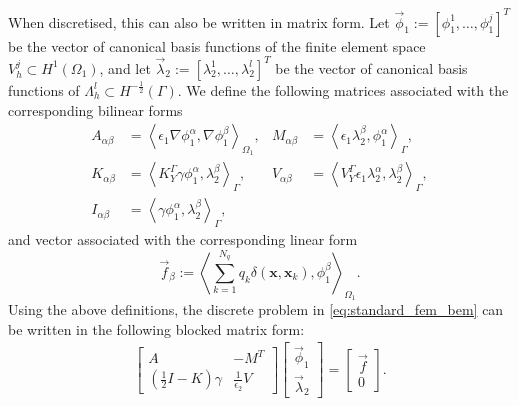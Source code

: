 When discretised, this can also be written in matrix form. Let $\vec{\phi}_1 := [\phi_1^1, \dots, \phi_1^j]^T$ be the vector of canonical basis
functions of the finite element space $V_{h}^{j}\subset H^1(\Omega_1)$, %
and let $\vec{\lambda}_2 := [\lambda_2^1, \dots, \lambda_2^l]^T$ be the vector of canonical basis
functions of $\Lambda_{h}^{l}\subset H^{-\frac{1}{2}}(\Gamma)$. %
We define the following matrices associated with the corresponding bilinear forms
\begin{align*}
A_{\alpha \beta} &= \left\langle\epsilon_1\nabla\phi_1^{\alpha}, \nabla \phi_1^{\beta} \right\rangle_{\Omega_1},&
M_{\alpha \beta} &= \left\langle \epsilon_1\lambda^{\beta}_2,\phi_1^{\alpha}\right\rangle_{\Gamma},\\
K_{\alpha \beta} &= \left\langle K_{Y}^{\Gamma} \gamma \phi^{\alpha}_1, \lambda^{\beta}_2 \right\rangle_{\Gamma},&
V_{\alpha \beta} &= \left\langle V_{Y}^{\Gamma} \epsilon_1\lambda^{\alpha}_2, \lambda^{\beta}_2 \right\rangle_{\Gamma},\\
I_{\alpha \beta} &= \left\langle \gamma \phi^{\alpha}_1, \lambda^{\beta}_2 \right\rangle_{\Gamma},
\end{align*}
and vector associated with the corresponding linear form
\begin{equation*}
\vec{f}_{\beta} := \left\langle  \sum_{k=1}^{N_q} q_k\delta(\mathbf{x},\mathbf{x}_k),  \phi_1^{\beta} \right\rangle_{\Omega_1}.
\end{equation*}
Using the above definitions, the discrete problem in \eqref{eq:standard_fem_bem} can be written in the following blocked matrix form:
\begin{align}\label{eq:fembem_matrix}
\begin{bmatrix}
A & -M^T \\  
\left(\tfrac12 I - K \right) \gamma &  \tfrac{1}{\epsilon_2} V 
\end{bmatrix}
\begin{bmatrix}
\vec{\phi}_1 \\  
\vec{\lambda}_2
\end{bmatrix}
= 
\begin{bmatrix}
\vec{f} \\  
0
\end{bmatrix}.
\end{align}

